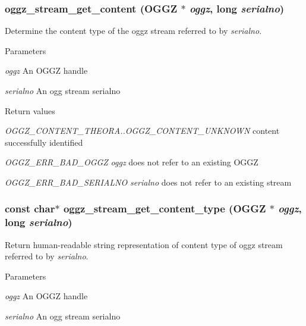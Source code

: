 \subsubsection[{oggz\_\-stream\_\-get\_\-content}]{ oggz\_\-stream\_\-get\_\-content ({\bf OGGZ} $\ast$ {\em oggz}, \/  long {\em serialno})}\label{oggz__stream_8h_a1cd43b28f34bf82dc1830cc517b19e14}


Determine the content type of the oggz stream referred to by {\itshape serialno\/}. 


\begin{DoxyParams}{Parameters}
\item[{\em oggz}]An OGGZ handle \item[{\em serialno}]An ogg stream serialno \end{DoxyParams}

\begin{DoxyRetVals}{Return values}
\item[{\em OGGZ\_\-CONTENT\_\-THEORA..OGGZ\_\-CONTENT\_\-UNKNOWN}]content successfully identified \item[{\em OGGZ\_\-ERR\_\-BAD\_\-OGGZ}]{\itshape oggz\/} does not refer to an existing OGGZ \item[{\em OGGZ\_\-ERR\_\-BAD\_\-SERIALNO}]{\itshape serialno\/} does not refer to an existing stream \end{DoxyRetVals}
\subsubsection[{oggz\_\-stream\_\-get\_\-content\_\-type}]{\setlength{\rightskip}{0pt plus 5cm}const char$\ast$ oggz\_\-stream\_\-get\_\-content\_\-type ({\bf OGGZ} $\ast$ {\em oggz}, \/  long {\em serialno})}\label{oggz__stream_8h_a85665d758dbc159bc48055bf3f572b37}


Return human-\/readable string representation of content type of oggz stream referred to by {\itshape serialno\/}. 


\begin{DoxyParams}{Parameters}
\item[{\em oggz}]An OGGZ handle \item[{\em serialno}]An ogg stream serialno \end{DoxyParams}

